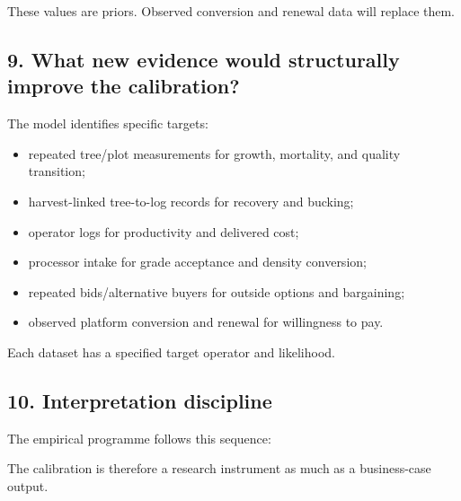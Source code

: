 These values are priors. Observed conversion and renewal data will replace them.

\subsection{9. What new evidence would structurally improve the calibration?}\label{what-new-evidence-would-structurally-improve-the-calibration}

The model identifies specific targets:

\begin{itemize}
\tightlist
\item
  repeated tree/plot measurements for growth, mortality, and quality transition;
\item
  harvest-linked tree-to-log records for recovery and bucking;
\item
  operator logs for productivity and delivered cost;
\item
  processor intake for grade acceptance and density conversion;
\item
  repeated bids/alternative buyers for outside options and bargaining;
\item
  observed platform conversion and renewal for willingness to pay.
\end{itemize}

Each dataset has a specified target operator and likelihood.

\subsection{10. Interpretation discipline}\label{interpretation-discipline}

The empirical programme follows this sequence:

\begin{Shaded}
\begin{Highlighting}[]
\end{Highlighting}
\end{Shaded}

The calibration is therefore a research instrument as much as a business-case
output.
